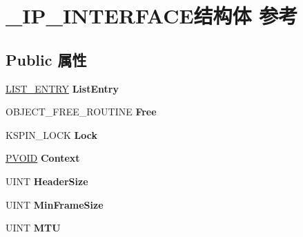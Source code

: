 \hypertarget{struct___i_p___i_n_t_e_r_f_a_c_e}{}\section{\+\_\+\+I\+P\+\_\+\+I\+N\+T\+E\+R\+F\+A\+C\+E结构体 参考}
\label{struct___i_p___i_n_t_e_r_f_a_c_e}
\subsection*{Public 属性}
\begin{DoxyCompactItemize}
\item 
\mbox{\label{struct___i_p___i_n_t_e_r_f_a_c_e_af57ab32398ae91dbc0831d1e48a05bc0}} 
\hyperlink{struct___l_i_s_t___e_n_t_r_y}{L\+I\+S\+T\+\_\+\+E\+N\+T\+RY} {\bfseries List\+Entry}
\item 
\mbox{\label{struct___i_p___i_n_t_e_r_f_a_c_e_a9e0bee9a8d138d64980043041563262f}} 
O\+B\+J\+E\+C\+T\+\_\+\+F\+R\+E\+E\+\_\+\+R\+O\+U\+T\+I\+NE {\bfseries Free}
\item 
\mbox{\label{struct___i_p___i_n_t_e_r_f_a_c_e_ad668f2588fbd6f9e9592d3519339ace0}} 
K\+S\+P\+I\+N\+\_\+\+L\+O\+CK {\bfseries Lock}
\item 
\mbox{\label{struct___i_p___i_n_t_e_r_f_a_c_e_ae194daa8ffbbe2a1d3726427cdc1a940}} 
\hyperlink{interfacevoid}{P\+V\+O\+ID} {\bfseries Context}
\item 
\mbox{\label{struct___i_p___i_n_t_e_r_f_a_c_e_aeaa832428f47d47cd5139af3c182b0fa}} 
U\+I\+NT {\bfseries Header\+Size}
\item 
\mbox{\label{struct___i_p___i_n_t_e_r_f_a_c_e_ad96059be892515b5e6db9795891afd30}} 
U\+I\+NT {\bfseries Min\+Frame\+Size}
\item 
\mbox{\label{struct___i_p___i_n_t_e_r_f_a_c_e_aad69e14e9d58edee2c3cd55bfd89c69a}} 
U\+I\+NT {\bfseries M\+TU}
\item 
\mbox{\label{struct___i_p___i_n_t_e_r_f_a_c_e_a3ef9f7becba20d3279df345281004d9b}} 

\end{DoxyCompactItemize}
